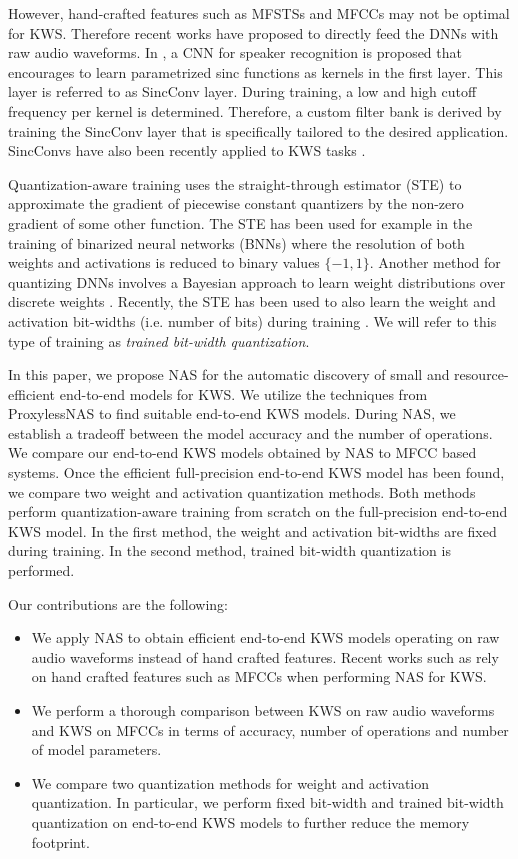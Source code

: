 \documentclass[a4paper]{article}
\begin{document}
However, hand-crafted features such as MFSTSs and MFCCs may not be optimal for KWS. Therefore recent works have proposed to directly feed the DNNs with raw audio waveforms. In \cite{Ravanelli2018}, a CNN for speaker recognition is proposed that encourages to learn parametrized sinc functions as kernels in the first layer. This layer is referred to as SincConv layer. During training, a low and high cutoff frequency per kernel is determined. Therefore, a custom filter bank is derived by training the SincConv layer that is specifically tailored to the desired application. SincConvs have also been recently applied to KWS tasks \cite{Mittermaier2020}.

Quantization-aware training uses the straight-through estimator (STE) \cite{Hinton2012,Bengio2013} to approximate the gradient of piecewise constant quantizers by the non-zero gradient of some other function. The STE has been used for example in the training of binarized neural networks (BNNs) where the resolution of both weights and activations is reduced to binary values $\{-1,1\}$. Another method for quantizing DNNs involves a Bayesian approach to learn weight distributions over discrete weights \cite{Roth2019}. Recently, the STE has been used to also learn the weight and activation bit-widths (i.e. number of bits) during training \cite{Uhlich2020}. We will refer to this type of training as\emph{ trained bit-width quantization}.

In this paper, we propose NAS for the automatic discovery of small and resource-efficient end-to-end models for KWS. We utilize the techniques from ProxylessNAS \cite{Cai2019} to find suitable end-to-end KWS models. During NAS, we establish a tradeoff between the model accuracy and the number of operations. We compare our end-to-end KWS models obtained by NAS to MFCC based systems. Once the efficient full-precision end-to-end KWS model has been found, we compare two weight and activation quantization methods. Both methods perform quantization-aware training from scratch on the full-precision end-to-end KWS model. In the first method, the weight and activation bit-widths are fixed during training. In the second method, trained bit-width quantization is performed.

\noindent
Our contributions are the following:
\begin{itemize}
	\item We apply NAS to obtain efficient end-to-end KWS models operating on raw audio waveforms instead of hand crafted features. Recent works such as \cite{Mo2020,Zhang2020,Peter2020} rely on hand crafted features such as MFCCs when performing NAS for KWS.
	\item We perform a thorough comparison between KWS on raw audio waveforms and KWS on MFCCs in terms of accuracy, number of operations and number of model parameters.
	\item We compare two quantization methods for weight and activation quantization. In particular, we perform fixed bit-width and trained bit-width quantization on end-to-end KWS models to further reduce the memory footprint. 
\end{itemize}
\end{document}
